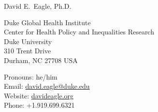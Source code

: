 \documentclass[12pt, letter]{article}
\makeatletter
\newcommand{\FirstName}{David E.}
\newcommand{\LastName}{Eagle}
\newcommand{\Degree}{Ph.D.}
\newcommand{\MyName}{\FirstName\ \LastName, \Degree}
\newcommand{\MyRole}{Assistant Research Professor}
\newcommand{\Email}{david.eagle@duke.edu}
\newcommand{\Website}{davideagle.org}
\newcommand{\Phone}{+1.919.699.6321}
\newcommand{\Affiliation}{
Duke Global Health Institute\\
Center for Health Policy and Inequalities Research\\
Duke University
}
\newcommand{\Address}{
    310 Trent Drive\\
    Durham, NC 27708 USA
}
\makeatother
\begin{document}
\setlength{\LTpre}{0pt}
\setlength{\LTpost}{2ex}
	
\thispagestyle{empty}

\begin{center}
    {\fontsize{24pt}{0}\selectfont \MyName}
    \\[0.3cm]
\end{center}

  \noindent
\begin{minipage}{.6\textwidth}
\Affiliation\\
\Address\\
\end{minipage}
\begin{minipage}{.4\textwidth}
\flushright
Pronouns: he/him\\
Email: \href{mailto:\Email}{\texttt\small{\Email}}\\
Website: {\texttt\small\href{\Website}{\Website}}\\
Phone: \Phone\\
\end{minipage}

\vspace{-1em}




%

%
%
%
%
%
\end{document}
